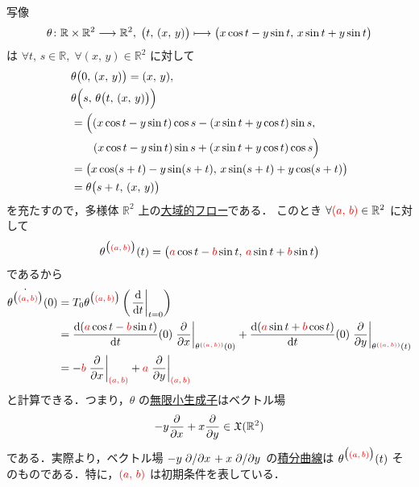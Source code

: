 \documentclass[geometry_main]{subfiles}
\begin{document}
\begin{myexample}[]{}
    \cinfty 写像
    \begin{align}
        \theta \colon \mathbb{R} \times \mathbb{R}^2 \longrightarrow \mathbb{R}^2,\; \bigl( t,\, (x,\, y) \bigr) \longmapsto \bigl( x \cos t - y \sin t,\, x \sin t + y \sin t \bigr) 
    \end{align}
    は $\forall t,\, s \in \mathbb{R},\; \forall (x,\, y) \in \mathbb{R}^2$ に対して 
    \begin{align}
        &\theta \bigl( 0,\, (x,\, y) \bigr) = (x,\, y), \\ 
        &\theta \Bigl( s,\, \theta \bigl( t,\, (x,\, y) \bigr)  \Bigr) \\
        &= \Bigl( (x \cos t - y \sin t) \cos s - (x \sin t + y \cos t) \sin s,\\
        &\qquad (x \cos t - y\sin t) \sin s + (x \sin t + y \cos t) \cos s \Bigr) \\
        &= \bigl( x \cos (s + t) - y \sin (s + t),\, x \sin (s + t) +  y \cos (s + t) \bigr) \\
        &= \theta \bigl( s + t,\, (x,\, y) \bigr)
    \end{align}
    を充たすので，多様体 $\mathbb{R}^2$ 上の\hyperref[def:global-flow]{大域的フロー}である．
    このとき $\forall \textcolor{red}{(a,\, b)} \in \mathbb{R}^2$ に対して
    \begin{align}
        \theta^{\bigl(\textcolor{red}{(a,\, b)}\bigr)} (t) = \bigl( \textcolor{red}{a} \cos t - \textcolor{red}{b} \sin t,\, \textcolor{red}{a} \sin t + \textcolor{red}{b} \sin t \bigr) 
    \end{align}
    であるから
    \begin{align}
        \dot{\theta^{\bigl(\textcolor{red}{(a,\, b)}\bigr)}} (0) 
        &= T_0 \theta^{\bigl(\textcolor{red}{(a,\, b)}\bigr)}  \left( \eval{\dv{}{t}}_{t=0} \right) \\
        &= \dv{(\textcolor{red}{a} \cos t - \textcolor{red}{b} \sin t)}{t}()(0) \eval{\pdv{}{x}}_{\theta^{(\textcolor{red}{(a,\, b)})} (0)} + \dv{(\textcolor{red}{a} \sin t + \textcolor{red}{b} \cos t)}{t}()(0) \eval{\pdv{}{y}}_{\theta^{(\textcolor{red}{(a,\, b)})} (t)} \\
        &= - \textcolor{red}{b} \eval{\pdv{}{x}}_{\textcolor{red}{(a,\, b)}} + \textcolor{red}{a} \eval{\pdv{}{y}}_{\textcolor{red}{(a,\, b)}}
    \end{align}
    と計算できる．つまり，$\theta$ の\hyperref[prop:infinitesimal-generator]{無限小生成子}はベクトル場
    \begin{align}
        -y \pdv{}{x} + x \pdv{}{y} \in \mathfrak{X}(\mathbb{R}^2)
    \end{align}
    である．実際より，ベクトル場 $-y \pdv*{}{x} + x \pdv*{}{y}$ の\hyperref[def:integral-curve]{積分曲線}は $\theta^{\bigl(\textcolor{red}{(a,\, b)}\bigr)} (t)$ そのものである．特に，$\textcolor{red}{(a,\, b)}$ は初期条件を表している．
\end{myexample}
\end{document}
